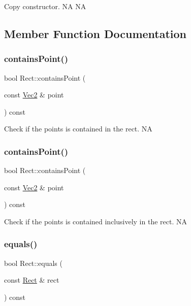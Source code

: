 Copy constructor.  NA  NA 

\subsection{Member Function Documentation}
\mbox{\label{classRect_ade04c4780618c8886ab11902b92a25ec}} 
\subsubsection{\texorpdfstring{contains\+Point()}{containsPoint()}\hspace{0.1cm}{\footnotesize\ttfamily [1/2]}}
{\footnotesize\ttfamily bool Rect\+::contains\+Point (\begin{DoxyParamCaption}\item[{const \hyperlink{classVec2}{Vec2} \&}]{point }\end{DoxyParamCaption}) const}

Check if the points is contained in the rect.  NA \mbox{\label{classRect_ade04c4780618c8886ab11902b92a25ec}} 
\subsubsection{\texorpdfstring{contains\+Point()}{containsPoint()}\hspace{0.1cm}{\footnotesize\ttfamily [2/2]}}
{\footnotesize\ttfamily bool Rect\+::contains\+Point (\begin{DoxyParamCaption}\item[{const \hyperlink{classVec2}{Vec2} \&}]{point }\end{DoxyParamCaption}) const}

Check if the points is contained inclusively in the rect.  NA \mbox{\label{classRect_af18d9c2a452430601e398fec58f4c8d3}} 
\subsubsection{\texorpdfstring{equals()}{equals()}\hspace{0.1cm}{\footnotesize\ttfamily [1/2]}}
{\footnotesize\ttfamily bool Rect\+::equals (\begin{DoxyParamCaption}\item[{const \hyperlink{classRect}{Rect} \&}]{rect }\end{DoxyParamCaption}) const}



